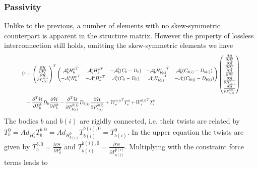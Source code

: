 \documentclass[a4paper,twoside, openright,12pt]{report}
\begin{document}
\subsubsection{Passivity}
Unlike to the previous, a number of elements with no skew-symmetric counterpart is apparent in the structure matrix. However the property of lossless interconnection still holds, omitting the skew-symmetric elements we have
\begin{eqnarray}
\resizebox{0.9\hsize}{!}{$
\begin{aligned}
\dot{V} &= 
\begin{pmatrix}\frac{\partial \mathcal{H}}{\partial P_b^b} \\ 
\frac{\partial \mathcal{H}}{\partial P_{b(i)}^{b(i)}}
\end{pmatrix}^T
\begin{pmatrix}
\mathcal{A}_b^b {H_b^0}^T & \mathcal{A}_b^b {H_b^v}^T & -\mathcal{A}_b^b(C_b-D_b) & -\mathcal{A}_b^i {H_{b(i)}^i}^T & \mathcal{A}_b^i (C_{b(i)} - D_{b(i)}) \\
-\mathcal{A}_i^b {H_b^0}^T & -\mathcal{A}_i^b {H_b^v}^T & \mathcal{A}_i^b(C_b-D_b)  & \mathcal{A}_i^i {H_{b(i)}^i}^T & -\mathcal{A}_i^i (C_{b(i)} - D_{b(i)})
\end{pmatrix}
\begin{pmatrix}\frac{\partial \mathcal{H}}{\partial H_b^0}\\ \frac{\partial \mathcal{H}}{\partial H_b^v} \\ \frac{\partial \mathcal{H}}{\partial P_b^b} \\ \frac{\partial \mathcal{H}}{\partial H_{b(i)}^i} \\ 
\frac{\partial \mathcal{H}}{\partial P_{b(i)}^{b(i)}}\end{pmatrix}\\
&- \frac{\partial^T \mathcal{H}}{\partial P_b^b} D_b \frac{\partial \mathcal{H}}{\partial P_b^b} - \frac{\partial^T \mathcal{H}}{\partial P_{b(i)}^{b(i)}} D_{b(i)} \frac{\partial \mathcal{H}}{\partial P_{b(i)}^{b(i)}} + {W_v^{0,0}}^T T_v^0 + {W_i^{0,0}}^T T_i^0
\end{aligned}
$}
\end{eqnarray}   
The bodies $b$ and $b(i)$ are rigidly connected, i.e. their twists are related by $T_b^0 = Ad_{H_b^0} T_b^{b,0} = Ad_{H_{b(i)}^0} T_{b(i)}^{b(i),0} = T_{b(i)}^0$. In the upper equation the twists are given by $T_{b}^{b,0} = \frac{\partial \mathcal{H}}{\partial P_{b}^{b}}$ and $T_{b(i)}^{b(i),0} = \frac{\partial \mathcal{H}}{\partial P_{b(i)}^{b(i)}}$. Multiplying with the constraint force terms leads to
\end{document}
